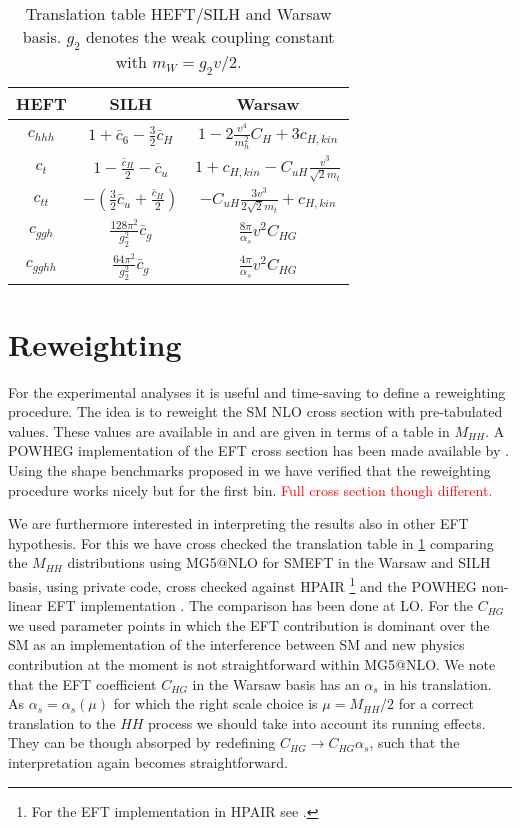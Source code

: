 \documentclass[12pt]{article}
\begin{document}
\begin{table}
\renewcommand*{\arraystretch}{1.6}
\begin{center}
\begin{tabular}{c c c}
\hline
\textbf{ HEFT} & \textbf {SILH} &  \textbf{Warsaw}\\ \hline
$c_{hhh}$ & $1+\bar{c}_6 -\frac{3}{2}\bar{c}_H $ & $1 - 2\frac{v^4}{m_h^2}C_H+3 c_{H,kin}$\\
$c_t$ &$ 1- \frac{\bar{c}_H}{2}-\bar{c}_u$ & $ 1+ c_{H,kin}-C_{uH}\frac{v^3}{\sqrt{2}m_t}$ \\
$c_{tt}$ & $-\left(\frac{3}{2}\bar{c}_u + \frac{\bar{c}_H}{2} \right)$&$ -C_{uH}\frac{3v^3}{2\sqrt{2}m_t}+c_{H,kin}$  \\
$c_{ggh}$ & $\frac{128 \pi^2}{g_2^2} \bar{c}_{g} $ &$\frac{8 \pi}{\alpha_s} v^2 C_{HG}$ \\
$c_{gghh}$ & $\frac{64 \pi^2}{g_2^2} \bar{c}_{g} $& $\frac{4 \pi}{\alpha_s} v^2 C_{HG}$\\
\end{tabular}
\end{center}
\caption{Translation table HEFT/SILH and Warsaw basis. $g_2$ denotes the weak coupling constant with $m_W=g_2 v/2$. \label{tab:translation}}
\end{table}

\section{Reweighting}

For the experimental analyses it is useful and time-saving to define a reweighting procedure. The idea is to reweight the SM NLO cross section with pre-tabulated values. These values are available in \cite{Buchalla:2018yce} and are given in terms of a table in $M_{HH}$. A POWHEG implementation of the EFT cross section has been made available by \cite{Heinrich:2020ckp}. Using the shape benchmarks proposed in \cite{Capozi:2019xsi} we have verified that the reweighting procedure works nicely but for the first bin. \textcolor{red}{Full cross section though different.}
\par
We are furthermore interested in interpreting the results also in other EFT hypothesis. For this we have cross checked the translation table in \ref{tab:translation} comparing the $M_{HH}$ distributions using MG5@NLO \cite{Alwall:2014hca} for SMEFT in the Warsaw and SILH basis, using private code, cross checked against HPAIR \cite{SPIRA, Dawson:1998py} \footnote{ For the EFT implementation in HPAIR see \cite{Grober:2015cwa}.} and the POWHEG non-linear EFT implementation \cite{Heinrich:2020ckp}.
The comparison has been done at LO. For the $C_{HG}$ we used parameter points in which the EFT contribution is dominant over the SM as  an implementation of the interference between SM and new physics contribution at the moment is not straightforward within MG5@NLO.
We note that the EFT coefficient $C_{HG}$ in the Warsaw basis has an $\alpha_s$ in his translation. As $\alpha_s=\alpha_s(\mu)$ for which the right scale choice is $\mu=M_{HH}/2$ for a correct translation to the $HH$ process we should take into account its running effects. They can be though absorped by redefining $C_{HG}\to C_{HG} \alpha_s$, such that the interpretation again becomes straightforward.
\end{document}
